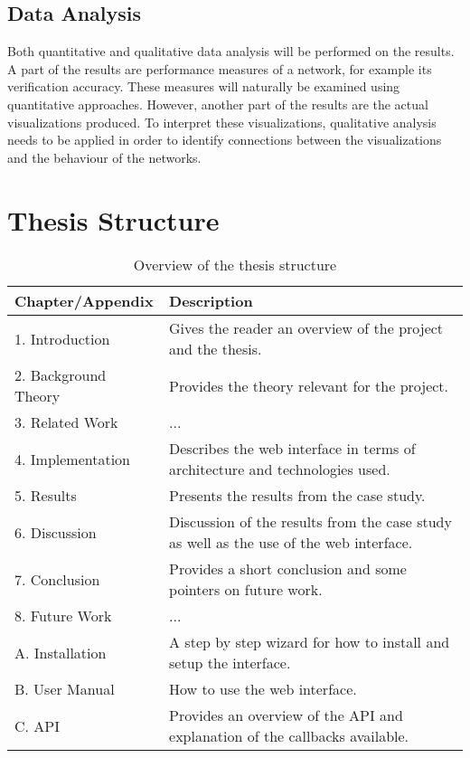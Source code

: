 \subsection{Data Analysis}

Both quantitative and qualitative data analysis will be performed on the results. A part of the results are performance measures of a network, for example its verification accuracy. These measures will naturally be examined using quantitative approaches. However, another part of the results are the actual visualizations produced. To interpret these visualizations, qualitative analysis needs to be applied in order to identify connections between the visualizations and the behaviour of the networks.

\section{Thesis Structure}

\begin{table}[!h]
\begin{center}
\begin{tabular}{ | l | p{8cm} |}
\hline
\textbf{Chapter/Appendix} & \textbf{Description} \\ \hline
1. Introduction & Gives the reader an overview of the project and the thesis. \\ \hline
2. Background Theory & Provides the theory relevant for the project. \\ \hline
3. Related Work & ... \\ \hline
4. Implementation & Describes the web interface in terms of architecture and technologies used. \\ \hline
5. Results & Presents the results from the case study. \\ \hline
6. Discussion & Discussion of the results from the case study as well as the use of the web interface. \\ \hline
7. Conclusion & Provides a short conclusion and some pointers on future work. \\ \hline
8. Future Work & ... \\ \hline
A. Installation & A step by step wizard for how to install and setup the interface. \\ \hline
B. User Manual & How to use the web interface. \\ \hline
C. API & Provides an overview of the API and explanation of the callbacks available. \\ \hline
\end{tabular}
\end{center}
\caption{Overview of the thesis structure}
\label{Tab1}
\end{table}

\cleardoublepage
